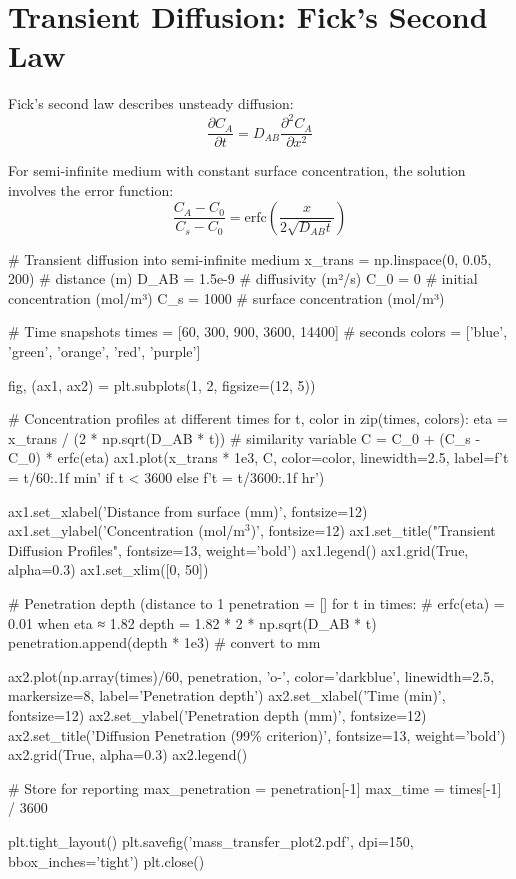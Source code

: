 \documentclass[11pt,a4paper]{article}
\begin{document}
\section{Transient Diffusion: Fick's Second Law}

Fick's second law describes unsteady diffusion:
\begin{equation}
\frac{\partial C_A}{\partial t} = D_{AB} \frac{\partial^2 C_A}{\partial x^2}
\end{equation}

For semi-infinite medium with constant surface concentration, the solution involves the error function:
\begin{equation}
\frac{C_A - C_0}{C_s - C_0} = \text{erfc}\left(\frac{x}{2\sqrt{D_{AB}t}}\right)
\end{equation}

\begin{pycode}
# Transient diffusion into semi-infinite medium
x_trans = np.linspace(0, 0.05, 200)  # distance (m)
D_AB = 1.5e-9  # diffusivity (m²/s)
C_0 = 0  # initial concentration (mol/m³)
C_s = 1000  # surface concentration (mol/m³)

# Time snapshots
times = [60, 300, 900, 3600, 14400]  # seconds
colors = ['blue', 'green', 'orange', 'red', 'purple']

fig, (ax1, ax2) = plt.subplots(1, 2, figsize=(12, 5))

# Concentration profiles at different times
for t, color in zip(times, colors):
    eta = x_trans / (2 * np.sqrt(D_AB * t))  # similarity variable
    C = C_0 + (C_s - C_0) * erfc(eta)
    ax1.plot(x_trans * 1e3, C, color=color, linewidth=2.5,
             label=f't = {t/60:.1f} min' if t < 3600 else f't = {t/3600:.1f} hr')

ax1.set_xlabel('Distance from surface (mm)', fontsize=12)
ax1.set_ylabel('Concentration (mol/m$^3$)', fontsize=12)
ax1.set_title("Transient Diffusion Profiles", fontsize=13, weight='bold')
ax1.legend()
ax1.grid(True, alpha=0.3)
ax1.set_xlim([0, 50])

# Penetration depth (distance to 1%
penetration = []
for t in times:
    # erfc(eta) = 0.01 when eta ≈ 1.82
    depth = 1.82 * 2 * np.sqrt(D_AB * t)
    penetration.append(depth * 1e3)  # convert to mm

ax2.plot(np.array(times)/60, penetration, 'o-', color='darkblue',
         linewidth=2.5, markersize=8, label='Penetration depth')
ax2.set_xlabel('Time (min)', fontsize=12)
ax2.set_ylabel('Penetration depth (mm)', fontsize=12)
ax2.set_title('Diffusion Penetration (99\% criterion)', fontsize=13, weight='bold')
ax2.grid(True, alpha=0.3)
ax2.legend()

# Store for reporting
max_penetration = penetration[-1]
max_time = times[-1] / 3600

plt.tight_layout()
plt.savefig('mass_transfer_plot2.pdf', dpi=150, bbox_inches='tight')
plt.close()
\end{pycode}
\end{document}
